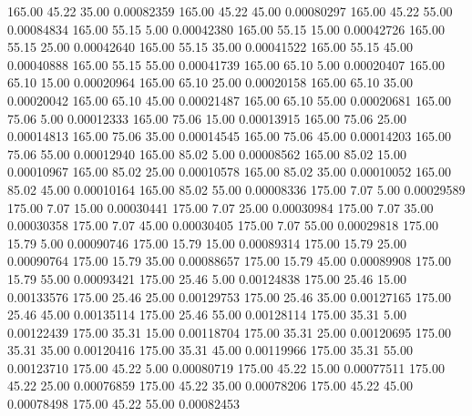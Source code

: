     165.00     45.22     35.00     0.00082359
    165.00     45.22     45.00     0.00080297
    165.00     45.22     55.00     0.00084834
    165.00     55.15      5.00     0.00042380
    165.00     55.15     15.00     0.00042726
    165.00     55.15     25.00     0.00042640
    165.00     55.15     35.00     0.00041522
    165.00     55.15     45.00     0.00040888
    165.00     55.15     55.00     0.00041739
    165.00     65.10      5.00     0.00020407
    165.00     65.10     15.00     0.00020964
    165.00     65.10     25.00     0.00020158
    165.00     65.10     35.00     0.00020042
    165.00     65.10     45.00     0.00021487
    165.00     65.10     55.00     0.00020681
    165.00     75.06      5.00     0.00012333
    165.00     75.06     15.00     0.00013915
    165.00     75.06     25.00     0.00014813
    165.00     75.06     35.00     0.00014545
    165.00     75.06     45.00     0.00014203
    165.00     75.06     55.00     0.00012940
    165.00     85.02      5.00     0.00008562
    165.00     85.02     15.00     0.00010967
    165.00     85.02     25.00     0.00010578
    165.00     85.02     35.00     0.00010052
    165.00     85.02     45.00     0.00010164
    165.00     85.02     55.00     0.00008336
    175.00      7.07      5.00     0.00029589
    175.00      7.07     15.00     0.00030441
    175.00      7.07     25.00     0.00030984
    175.00      7.07     35.00     0.00030358
    175.00      7.07     45.00     0.00030405
    175.00      7.07     55.00     0.00029818
    175.00     15.79      5.00     0.00090746
    175.00     15.79     15.00     0.00089314
    175.00     15.79     25.00     0.00090764
    175.00     15.79     35.00     0.00088657
    175.00     15.79     45.00     0.00089908
    175.00     15.79     55.00     0.00093421
    175.00     25.46      5.00     0.00124838
    175.00     25.46     15.00     0.00133576
    175.00     25.46     25.00     0.00129753
    175.00     25.46     35.00     0.00127165
    175.00     25.46     45.00     0.00135114
    175.00     25.46     55.00     0.00128114
    175.00     35.31      5.00     0.00122439
    175.00     35.31     15.00     0.00118704
    175.00     35.31     25.00     0.00120695
    175.00     35.31     35.00     0.00120416
    175.00     35.31     45.00     0.00119966
    175.00     35.31     55.00     0.00123710
    175.00     45.22      5.00     0.00080719
    175.00     45.22     15.00     0.00077511
    175.00     45.22     25.00     0.00076859
    175.00     45.22     35.00     0.00078206
    175.00     45.22     45.00     0.00078498
    175.00     45.22     55.00     0.00082453
